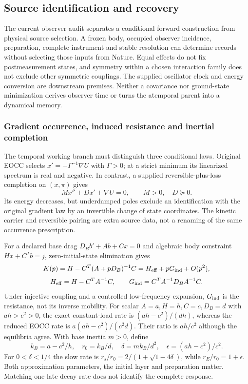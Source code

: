 \documentclass[11pt]{article}
\begin{document}
\subsection{Source identification and recovery}
The current observer audit separates a conditional forward construction from physical source selection. A frozen body, occupied observer incidence, preparation, complete instrument and stable resolution can determine records without selecting those inputs from Nature. Equal effects do not fix postmeasurement states, and symmetry within a chosen interaction family does not exclude other symmetric couplings. The supplied oscillator clock and energy conversion are downstream premises. Neither a covariance nor ground-state minimization derives observer time or turns the atemporal parent into a dynamical memory.
\subsubsection{Gradient occurrence, induced resistance and inertial completion}
The temporal working branch must distinguish three conditional laws. Original
EOCC selects $x'=-\Gamma^{-1}\nabla U$ with $\Gamma>0$; at a strict minimum
its linearized spectrum is real and negative. In contrast, a supplied
reversible-plus-loss completion on $(x,\pi)$ gives
\[
 Mx''+Dx'+\nabla U=0,\qquad M>0,\quad D\succeq0.
\]
Its energy decreases, but underdamped poles exclude an identification with
the original gradient law by an invertible change of state coordinates.
The kinetic carrier and reversible pairing are extra source data, not a
renaming of the same occurrence prescription.

For a declared base drag $D_Bb'+Ab+Cx=0$ and algebraic body constraint
$Hx+C^Tb=j$, zero-initial-state elimination gives
\[
 K(p)=H-C^T(A+pD_B)^{-1}C
 =H_{\rm eff}+pG_{\rm ind}+O(p^2),
\]
\[
 H_{\rm eff}=H-C^TA^{-1}C,\qquad
 G_{\rm ind}=C^TA^{-1}D_BA^{-1}C.
\]
Under injective coupling and a controlled low-frequency expansion,
$G_{\rm ind}$ is the resistance, not its inverse mobility. For scalar
$A=a,H=h,C=c,D_B=d$ with $ah>c^2>0$, the exact constant-load rate is
$(ah-c^2)/(dh)$, whereas the reduced EOCC rate is
$a(ah-c^2)/(c^2d)$. Their ratio is $ah/c^2$ although the equilibria agree.
With base inertia $m>0$, define
\[
 k_B=a-c^2/h,\quad r_0=k_B/d,\quad
 \delta=mk_B/d^2,\quad \epsilon=(ah-c^2)/c^2.
\]
For $0<\delta<1/4$ the slow rate is
$r_s/r_0=2/(1+\sqrt{1-4\delta})$, while $r_E/r_0=1+\epsilon$.
Both approximation parameters, the initial layer and preparation matter.
Matching one late decay rate does not identify the complete response.
\end{document}
